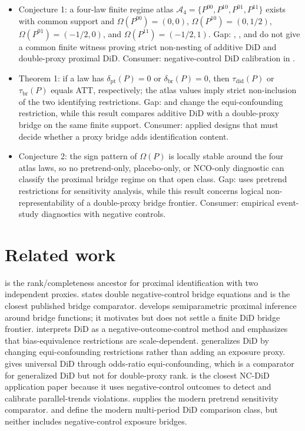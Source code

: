 \documentclass[11pt]{article}
\theoremstyle{definition}
\theoremstyle{plain}
\theoremstyle{remark}
\begin{document}
\begin{itemize}[leftmargin=*]
\item Conjecture 1: a four-law finite regime atlas \(\mathcal A_4=\{P^{00},P^{10},P^{01},P^{11}\}\) exists with common support and \(\Omega(P^{00})=(0,0)\), \(\Omega(P^{10})=(0,1/2)\), \(\Omega(P^{01})=(-1/2,0)\), and \(\Omega(P^{11})=(-1/2,1)\). Gap: \citet{SoferRichardsonColicinoSchwartzTchetgen2016}, \citet{MiaoShiLiTchetgen2024}, and \citet{ZhangZhangWangEtAl2025} do not give a common finite witness proving strict non-nesting of additive DiD and double-proxy proximal DiD. Consumer: negative-control DiD calibration in \citet{ZhangZhangWangEtAl2025}.
\item Theorem 1: if a law has \(\delta_{\mathrm{pt}}(P)=0\) or \(\delta_{\mathrm{br}}(P)=0\), then \(\tau_{\mathrm{did}}(P)\) or \(\tau_{\mathrm{br}}(P)\) equals ATT, respectively; the atlas values imply strict non-inclusion of the two identifying restrictions. Gap: \citet{RichardsonYeTchetgen2023} and \citet{TchetgenParkRichardson2024} change the equi-confounding restriction, while this result compares additive DiD with a double-proxy bridge on the same finite support. Consumer: applied designs that must decide whether a proxy bridge adds identification content.
\item Conjecture 2: the sign pattern of \(\Omega(P)\) is locally stable around the four atlas laws, so no pretrend-only, placebo-only, or NCO-only diagnostic can classify the proximal bridge regime on that open class. Gap: \citet[Sec.~3]{RambachanRoth2023} uses pretrend restrictions for sensitivity analysis, while this result concerns logical non-representability of a double-proxy bridge frontier. Consumer: empirical event-study diagnostics with negative controls.
\end{itemize}

\section{Related work}
\citet{MiaoGengTchetgen2018} is the rank/completeness ancestor for proximal identification with two independent proxies. \citet{MiaoShiLiTchetgen2024} states double negative-control bridge equations and is the closest published bridge comparator. \citet{CuiPuShiMiaoTchetgen2024} develops semiparametric proximal inference around bridge functions; it motivates but does not settle a finite DiD bridge frontier. \citet{SoferRichardsonColicinoSchwartzTchetgen2016} interprets DiD as a negative-outcome-control method and emphasizes that bias-equivalence restrictions are scale-dependent. \citet{RichardsonYeTchetgen2023} generalizes DiD by changing equi-confounding restrictions rather than adding an exposure proxy. \citet{TchetgenParkRichardson2024} gives universal DiD through odds-ratio equi-confounding, which is a comparator for generalized DiD but not for double-proxy rank. \citet{ZhangZhangWangEtAl2025} is the closest NC-DiD application paper because it uses negative-control outcomes to detect and calibrate parallel-trends violations. \citet{RambachanRoth2023} supplies the modern pretrend sensitivity comparator. \citet{CallawaySantAnna2021} and \citet{SunAbraham2021} define the modern multi-period DiD comparison class, but neither includes negative-control exposure bridges.
\end{document}
